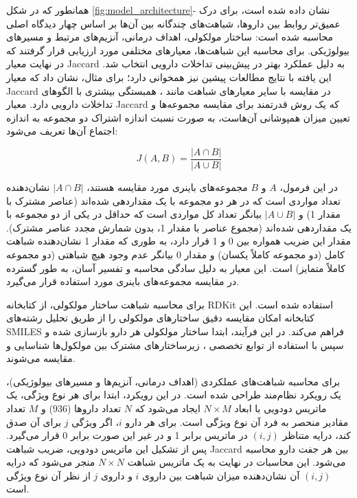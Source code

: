 همانطور که در شکل \ref{fig:model_architecture}- نشان داده شده است، برای درک عمیق‌تر روابط بین داروها، شباهت‌های چندگانه بین آن‌ها بر اساس چهار دیدگاه اصلی محاسبه شده است: ساختار مولکولی، اهداف درمانی، آنزیم‌های مرتبط و مسیرهای بیولوژیکی. برای محاسبه این شباهت‌ها، معیارهای مختلفی مورد ارزیابی قرار گرفتند که در نهایت معیار Jaccard به دلیل عملکرد بهتر در پیش‌بینی تداخلات دارویی انتخاب شد. این یافته با نتایج مطالعات پیشین نیز همخوانی دارد؛ برای مثال، \cite{ref_kumari2024} نشان داد که معیار Jaccard در مقایسه با سایر معیارهای شباهت مانند ، همبستگی بیشتری با الگوهای تداخلات دارویی دارد. معیار Jaccard که یک روش قدرتمند برای مقایسه مجموعه‌ها و تعیین میزان همپوشانی آن‌هاست، به صورت نسبت اندازه اشتراک دو مجموعه به اندازه اجتماع آن‌ها تعریف می‌شود:

\begin{equation}
	J(A,B) = \frac{|A \cap B|}{|A \cup B|}
\end{equation}

در این فرمول، $A$ و $B$ مجموعه‌های باینری مورد مقایسه هستند، $|A \cap B|$ نشان‌دهنده تعداد مواردی است که در هر دو مجموعه با یک مقداردهی شده‌اند (عناصر مشترک با مقدار 1) و $|A \cup B|$ بیانگر تعداد کل مواردی است که حداقل در یکی از دو مجموعه با یک مقداردهی شده‌اند (مجموع عناصر با مقدار 1، بدون شمارش مجدد عناصر مشترک). مقدار این ضریب همواره بین 0 و 1 قرار دارد، به طوری که مقدار 1 نشان‌دهنده شباهت کامل (دو مجموعه کاملاً یکسان) و مقدار 0 بیانگر عدم وجود هیچ شباهتی (دو مجموعه کاملاً متمایز) است. این معیار به دلیل سادگی محاسبه و تفسیر آسان، به طور گسترده در مقایسه مجموعه‌های باینری مورد استفاده قرار می‌گیرد.

برای محاسبه شباهت ساختار مولکولی، از کتابخانه RDKit استفاده شده است. این کتابخانه امکان مقایسه دقیق ساختارهای مولکولی را از طریق تحلیل رشته‌های SMILES فراهم می‌کند. در این فرآیند، ابتدا ساختار مولکولی هر دارو بازسازی شده و سپس با استفاده از توابع تخصصی ، زیرساختارهای مشترک بین مولکول‌ها شناسایی و مقایسه می‌شوند.

برای محاسبه شباهت‌های عملکردی (اهداف درمانی، آنزیم‌ها و مسیرهای بیولوژیکی)، یک رویکرد نظام‌مند طراحی شده است. در این رویکرد، ابتدا برای هر نوع ویژگی، یک ماتریس دودویی با ابعاد $N \times M$ ایجاد می‌شود که $N$ تعداد داروها (936) و $M$ تعداد مقادیر منحصر به فرد آن نوع ویژگی است. برای هر دارو $i$، اگر ویژگی $j$ برای آن صدق کند، درایه متناظر $(i,j)$ در ماتریس برابر 1 و در غیر این صورت برابر 0 قرار می‌گیرد. پس از تشکیل این ماتریس دودویی، ضریب شباهت Jaccard بین هر جفت دارو محاسبه می‌شود. این محاسبات در نهایت به یک ماتریس شباهت $N \times N$ منجر می‌شود که درایه $(i,j)$ آن نشان‌دهنده میزان شباهت بین داروی $i$ و داروی $j$ از نظر آن نوع ویژگی است.

